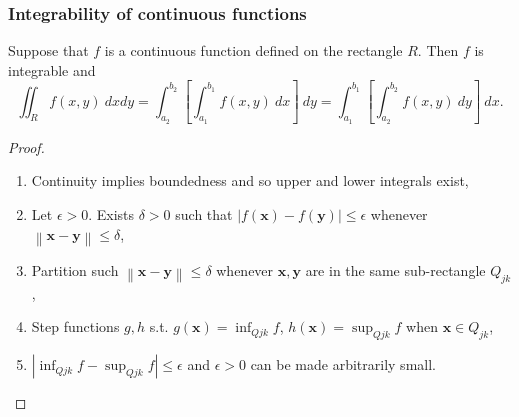 \documentclass[aspectratio=169,handout]{beamer}
\newcommand{\abs}[1]{\left|#1\right|} %
\newcommand{\norm}[1]{\left\|#1\right\|} %
\newcommand{\xx}{\mathbf{x}}
\newcommand{\yy}{\mathbf{y}}
\begin{document}
\begin{frame}
    \frametitle{Integrability of continuous functions}

    \begin{theorem}
        Suppose that \(f\) is a continuous function defined on the rectangle \(R\).
        Then \(f\) is integrable and
        \[
            \iint_{R} f(x,y) \ dxdy
            = \int_{a_2}^{b_2} \left[ \int_{a_1}^{b_1} f(x,y) \ dx  \right] \ dy
            = \int_{a_1}^{b_1} \left[\int_{a_2}^{b_2}  f(x,y) \ dy  \right] \ dx.
        \]
    \end{theorem}
    \begin{proof}
        \begin{enumerate}
            \item Continuity implies boundedness and so upper and lower integrals exist,
            \item Let \(\epsilon>0\). Exists \(\delta>0\) such that \(\abs{f(\xx)-f(\yy)}\leq \epsilon\) whenever \(\norm{\xx-\yy}\leq \delta\),
            \item Partition such  \(\norm{\xx-\yy}\leq \delta\) whenever \(\xx,\yy\) are in the same sub-rectangle \(Q_{jk}\),
            \item Step functions \(g,h\) s.t. \(g(\xx)=\inf_{Q{jk}} f\),   \(h(\xx)=\sup_{Q{jk}} f\) when \(\xx\in Q_{jk}\),
            \item \(\abs{\inf_{Q{jk}} f - \sup_{Q{jk}} f }\leq \epsilon\) and \(\epsilon>0\) can be made arbitrarily small.
        \end{enumerate}
    \end{proof}

\end{frame}
\end{document}
